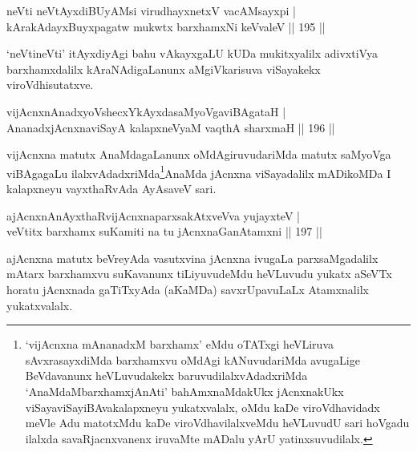 \begin{shl}
neVti neVtAyxdiBUyAMsi virudhayxnetxV vacAMsayxpi |\\
kArakAdayxBuyxpagatw mukwtx barxhamxNi keVvaleV \hfill || 195 ||
\end{shl}

\begin{artha}
`neVtineVti' itAyxdiyAgi bahu vAkayxgaLU kUDa mukitxyalilx adivxtiVya barxhamxdalilx kAraNAdigaLanunx aMgiVkarisuva viSayakekx viroVdhisutatxve.
\end{artha}

\begin{shl}
vijAcnxnAnadxyoVshecxYkAyxdasaMyoVgaviBAgataH |\\
AnanadxjAcnxnaviSayA kalapxneVyaM vaqthA sharxmaH \hfill || 196 ||
\end{shl}	

\begin{artha}
vijAcnxna matutx AnaMdagaLanunx oMdAgiruvudariMda matutx saMyoVga viBAgagaLu ilalxvAdadxriMda\footnote{`vijAcnxna mAnanadxM barxhamx' eMdu oTATxgi heVLiruva sAvxrasayxdiMda barxhamxvu oMdAgi kANuvudariMda avugaLige BeVdavanunx heVLuvudakekx baruvudilalxvAdadxriMda `AnaMdaMbarxhamxjAnAti' bahAmxnaMdakUkx jAcnxnakUkx viSayaviSayiBAvakalapxneyu yukatxvalalx, oMdu kaDe viroVdhavidadx meVle Adu matotxMdu kaDe viroVdhavilalxveMdu heVLuvudU sari hoVgadu ilalxda savaRjacnxvanenx iruvaMte mADalu yArU yatinxsuvudilalx.}AnaMda jAcnxna viSayadalilx mADikoMDa I kalapxneyu vayxthaRvAda AyAsaveV sari.
\end{artha}


\begin{shl}
ajAcnxnAnAyxthaRvijAcnxnaparxsakAtxveVva yujayxteV |\\
veVtitx barxhamx suKamiti na tu jAcnxnaGanAtamxni \hfill || 197 ||
\end{shl}

\begin{artha}
ajAcnxna matutx beVreyAda vasutxvina jAcnxna ivugaLa parxsaMgadalilx mAtarx barxhamxvu suKavanunx tiLiyuvudeMdu heVLuvudu yukatx aSeVTx horatu jAcnxnada gaTiTxyAda (aKaMDa) savxrUpavuLaLx Atamxnalilx yukatxvalalx.
\end{artha}


